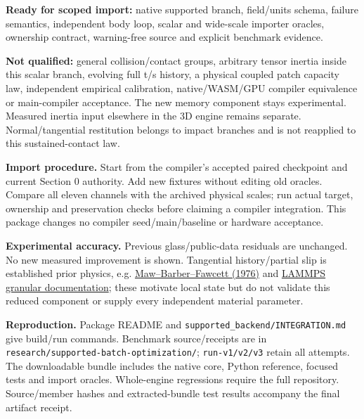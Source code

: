 \documentclass[10pt,a4paper]{article}
\begin{document}
\textbf{Ready for scoped import:} native supported branch, field/units schema,
failure semantics, independent body loop, scalar and wide-scale importer oracles,
ownership contract, warning-free source and explicit benchmark evidence.

\textbf{Not qualified:} general collision/contact groups, arbitrary tensor inertia
inside this scalar branch, evolving full t/s history, a physical coupled patch
capacity law, independent empirical calibration, native/WASM/GPU compiler
equivalence or main-compiler acceptance. The new memory component stays
experimental. Measured inertia input elsewhere in the 3D engine remains separate.
Normal/tangential restitution belongs to impact branches and is not reapplied to
this sustained-contact law.

\textbf{Import procedure.} Start from the compiler's accepted paired checkpoint
and current Section 0 authority. Add new fixtures without editing old oracles.
Compare all eleven channels with the archived physical scales; run actual target,
ownership and preservation checks before claiming a compiler integration.
This package changes no compiler seed/main/baseline or hardware acceptance.

\textbf{Experimental accuracy.} Previous glass/public-data residuals are unchanged.
No new measured improvement is shown. Tangential history/partial slip is
established prior physics, e.g. \href{https://websites.umich.edu/~jbarber/Wear1976.pdf}{Maw--Barber--Fawcett (1976)}
and \href{https://doc.lammps.org/pair_granular.html}{LAMMPS granular documentation};
these motivate local state but do not validate this reduced component or supply
every independent material parameter.

\textbf{Reproduction.} Package README and \texttt{supported\_backend/INTEGRATION.md}
give build/run commands. Benchmark source/receipts are in
\texttt{research/supported-batch-optimization/}; \texttt{run-v1/v2/v3} retain all
attempts. The downloadable bundle includes the native core, Python reference,
focused tests and import oracles. Whole-engine regressions require the full
repository. Source/member hashes and extracted-bundle test results accompany
the final artifact receipt.
\end{document}
